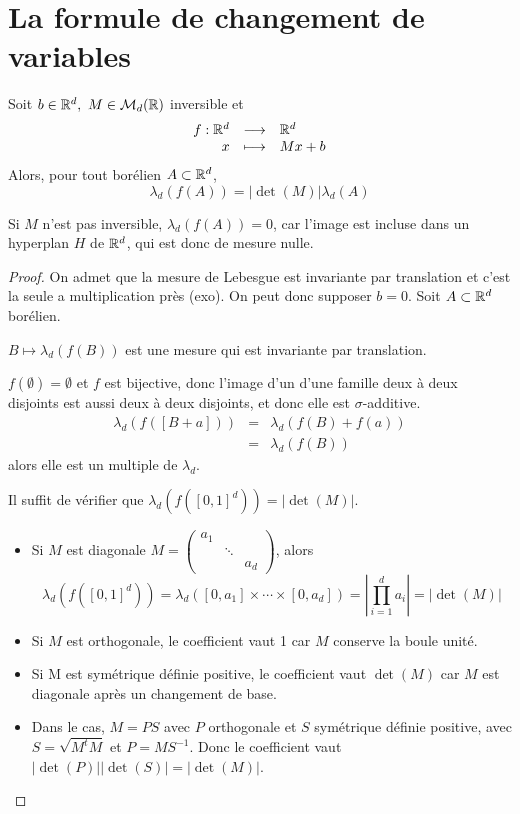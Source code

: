 
\section{La formule de changement de variables}


\begin{prop}
	Soit $b \in \mathbb{R}^d, \ M \in \mathcal{M}_d(\mathbb{R})$ inversible et
	$$ \begin{array}{rcl}
			f : \mathbb{R}^d & \longrightarrow & \mathbb{R}^d   \\
			x        & \longmapsto     & Mx + b
		\end{array} $$
	Alors, pour tout borélien $A \subset \mathbb{R}^d$,
	$$ \lambda_d(f(A)) = |\det(M)| \lambda_d(A) $$
\end{prop}

\begin{remarque}
	Si $M$ n'est pas inversible, $\lambda_d(f(A)) = 0$, car l'image est incluse dans un hyperplan $H$
	de $\mathbb{R}^d$, qui est donc de mesure nulle.
\end{remarque}

\begin{proof}
	On admet que la mesure de Lebesgue est invariante par translation et c'est la seule a multiplication près (exo). On peut donc supposer
	$b = 0$. Soit $A \subset \mathbb{R}^d$ borélien.

	$B \mapsto \lambda_d(f(B))$ est une mesure qui est invariante par translation.

	$f (\emptyset) = \emptyset$ et $f$ est bijective, donc l'image d'un d'une famille deux à deux disjoints est aussi deux à deux disjoints, et donc elle est
	$\sigma$-additive.
	\begin{eqnarray*}
		\lambda_d(f([B+a])) &=& \lambda_d(f(B) + f(a)) \\
		&=& \lambda_d(f(B))
	\end{eqnarray*}
	alors elle est un multiple de $\lambda_d$.

	Il suffit de vérifier que $\lambda_d(f([0,1]^d)) = |\det(M)|$.

	\begin{itemize}
		\item Si $M$ est diagonale $M = \begin{pmatrix} a_1 & & \\ & \ddots & \\ & & a_d \end{pmatrix}$, alors
		      $$ \lambda_d(f([0,1]^d)) = \lambda_d([0, a_1] \times \cdots \times [0, a_d]) =\left| \prod_{i=1}^d a_i \right|= |\det(M)| $$
		\item Si $M$ est orthogonale, le coefficient vaut 1 car $M$ conserve la boule unité.
		\item Si M est symétrique définie positive, le coefficient vaut $\det(M)$ car $M$ est diagonale après un changement de base.
		\item Dans le cas, $M = PS$ avec $P$ orthogonale et $S$ symétrique définie positive, avec $S =\sqrt{M^tM}$ et $P = M S^{-1}$.
		      Donc le coefficient vaut $|\det(P)| |\det(S)| = |\det(M)|$.
	\end{itemize}
\end{proof}



